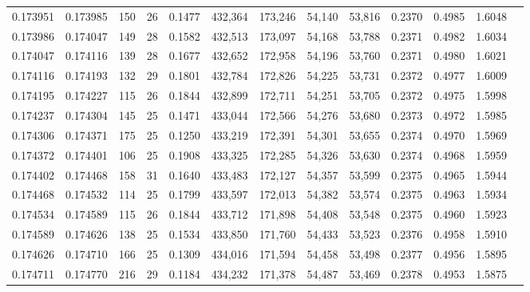 \begin{tabular}{rrrrrrrrrrrrr}
0.173951 & 0.173985 & 150 &  26 &                                     0.1477 & 432,364 & 173,246 &  54,140 &  53,816 & 0.2370 & 0.4985 & 1.6048 \\
0.173986 & 0.174047 & 149 &  28 &                                     0.1582 & 432,513 & 173,097 &  54,168 &  53,788 & 0.2371 & 0.4982 & 1.6034 \\
0.174047 & 0.174116 & 139 &  28 &                                     0.1677 & 432,652 & 172,958 &  54,196 &  53,760 & 0.2371 & 0.4980 & 1.6021 \\
0.174116 & 0.174193 & 132 &  29 &                                     0.1801 & 432,784 & 172,826 &  54,225 &  53,731 & 0.2372 & 0.4977 & 1.6009 \\
0.174195 & 0.174227 & 115 &  26 &                                     0.1844 & 432,899 & 172,711 &  54,251 &  53,705 & 0.2372 & 0.4975 & 1.5998 \\
0.174237 & 0.174304 & 145 &  25 &                                     0.1471 & 433,044 & 172,566 &  54,276 &  53,680 & 0.2373 & 0.4972 & 1.5985 \\
0.174306 & 0.174371 & 175 &  25 &                                     0.1250 & 433,219 & 172,391 &  54,301 &  53,655 & 0.2374 & 0.4970 & 1.5969 \\
0.174372 & 0.174401 & 106 &  25 &                                     0.1908 & 433,325 & 172,285 &  54,326 &  53,630 & 0.2374 & 0.4968 & 1.5959 \\
0.174402 & 0.174468 & 158 &  31 &                                     0.1640 & 433,483 & 172,127 &  54,357 &  53,599 & 0.2375 & 0.4965 & 1.5944 \\
0.174468 & 0.174532 & 114 &  25 &                                     0.1799 & 433,597 & 172,013 &  54,382 &  53,574 & 0.2375 & 0.4963 & 1.5934 \\
0.174534 & 0.174589 & 115 &  26 &                                     0.1844 & 433,712 & 171,898 &  54,408 &  53,548 & 0.2375 & 0.4960 & 1.5923 \\
0.174589 & 0.174626 & 138 &  25 &                                     0.1534 & 433,850 & 171,760 &  54,433 &  53,523 & 0.2376 & 0.4958 & 1.5910 \\
0.174626 & 0.174710 & 166 &  25 &                                     0.1309 & 434,016 & 171,594 &  54,458 &  53,498 & 0.2377 & 0.4956 & 1.5895 \\
0.174711 & 0.174770 & 216 &  29 &                                     0.1184 & 434,232 & 171,378 &  54,487 &  53,469 & 0.2378 & 0.4953 & 1.5875 \\

\end{tabular}
